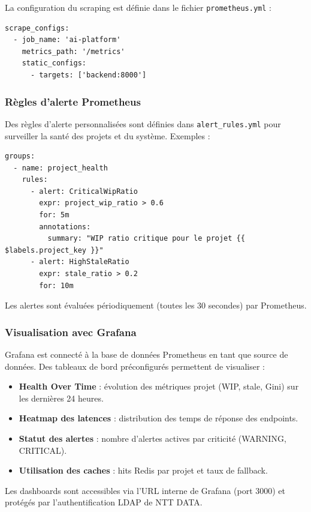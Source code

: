 La configuration du scraping est définie dans le fichier \texttt{prometheus.yml} :

\begin{verbatim}
scrape_configs:
  - job_name: 'ai-platform'
    metrics_path: '/metrics'
    static_configs:
      - targets: ['backend:8000']
\end{verbatim}

\subsubsection{Règles d'alerte Prometheus}

Des règles d'alerte personnalisées sont définies dans \texttt{alert\_rules.yml} pour surveiller la santé des projets et du système. Exemples :

\begin{verbatim}
groups:
  - name: project_health
    rules:
      - alert: CriticalWipRatio
        expr: project_wip_ratio > 0.6
        for: 5m
        annotations:
          summary: "WIP ratio critique pour le projet {{ $labels.project_key }}"
      - alert: HighStaleRatio
        expr: stale_ratio > 0.2
        for: 10m
\end{verbatim}

Les alertes sont évaluées périodiquement (toutes les 30 secondes) par Prometheus.

\subsubsection{Visualisation avec Grafana}

Grafana est connecté à la base de données Prometheus en tant que source de données. Des tableaux de bord préconfigurés permettent de visualiser :

\begin{itemize}
    \renewcommand{\labelitemi}{—}
    \item \textbf{Health Over Time} : évolution des métriques projet (WIP, stale, Gini) sur les dernières 24 heures.
    \item \textbf{Heatmap des latences} : distribution des temps de réponse des endpoints.
    \item \textbf{Statut des alertes} : nombre d'alertes actives par criticité (WARNING, CRITICAL).
    \item \textbf{Utilisation des caches} : hits Redis par projet et taux de fallback.
\end{itemize}

Les dashboards sont accessibles via l'URL interne de Grafana (port 3000) et protégés par l'authentification LDAP de NTT DATA.

